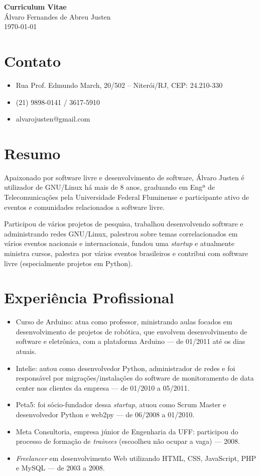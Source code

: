 \documentclass[a4paper,11pt]{article}
\begin{document}
\pagestyle{empty}

\begin{center}
 \huge{\textbf{Curriculum Vitae}}
 \\
 \huge{Álvaro Fernandes de Abreu Justen}
 \\
 \large{\today}
\end{center}

\newcommand{\titulo}[1]{\section*{#1}}
\renewcommand{\labelitemi}{$\diamond$}
\renewcommand{\labelitemii}{$\rightarrow$}

\titulo{Contato}
\begin{itemize}
\renewcommand{\labelitemi}{}
\item Rua Prof. Edmundo March, 20/502 -- Niterói/RJ, CEP: 24.210-330
\item (21) 9898-0141 / 3617-5910
\item alvarojusten@gmail.com
\end{itemize}

\titulo{Resumo}

Apaixonado por software livre e desenvolvimento de software, Álvaro Justen é
utilizador de GNU/Linux há mais de 8 anos, graduando em Engª de
Telecomunicações pela Universidade Federal Fluminense e participante ativo de
eventos e comunidades relacionados a software livre.

Participou de vários projetos de pesquisa, trabalhou desenvolvendo software
e administrando redes GNU/Linux, palestrou sobre temas correlacionados em
vários eventos nacionais e internacionais, fundou uma \textit{startup} e
atualmente ministra cursos, palestra por vários eventos brasileiros e contribui
com software livre (especialmente projetos em Python).

\titulo{Experiência Profissional}
 \begin{itemize}
  \item Curso de Arduino: atua como professor, ministrando aulas focados em
  desenvolvimento de projetos de robótica, que envolvem desenvolvimento de
  software e eletrônica, com a plataforma Arduino --- de 01/2011 até os dias
  atuais.
  \item Intelie: autou como desenvolvedor Python, administrador de redes e foi
  responsável por migrações/instalações do software de monitoramento de data
  center nos clientes da empresa --- de 01/2010 a 05/2011.
  \item Peta5: foi sócio-fundador dessa \textit{startup}, atuou como Scrum
  Master e desenvolvedor Python e web2py --- de 06/2008 a 01/2010.
  \item Meta Consultoria, empresa júnior de Engenharia da UFF: participou do
  processo de formação de \textit{trainees} (escoolheu não ocupar a vaga) ---
  2008.
  \item \textit{Freelancer} em desenvolvimento Web utilizando HTML, CSS,
  JavaScript, PHP e MySQL --- de 2003 a 2008.
\end{itemize}
\end{document}
